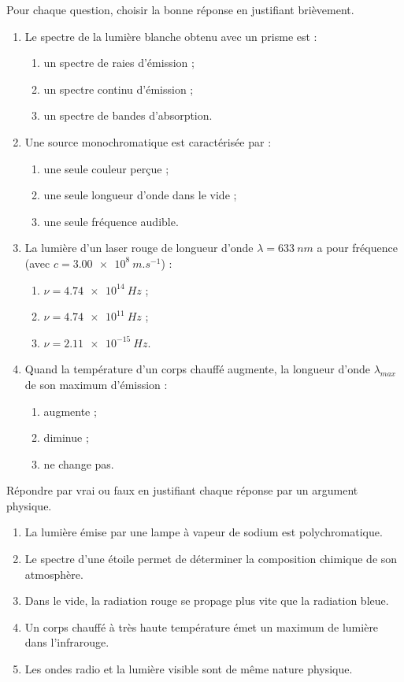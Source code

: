 \documentclass[11pt]{article}
\begin{document}
\begin{exercice}
Pour chaque question, choisir la bonne réponse en justifiant brièvement.
\begin{enumerate}
\item Le spectre de la lumière blanche obtenu avec un prisme est :
\begin{enumerate}
\item un spectre de raies d'émission ;
\item un spectre continu d'émission ;
\item un spectre de bandes d'absorption.
\end{enumerate}
\item Une source monochromatique est caractérisée par :
\begin{enumerate}
\item une seule couleur perçue ;
\item une seule longueur d'onde dans le vide ;
\item une seule fréquence audible.
\end{enumerate}
\item La lumière d'un laser rouge de longueur d'onde $\lambda = \SI{633}{nm}$ a pour fréquence (avec $c = \SI{3,00e8}{m.s^{-1}}$) :
\begin{enumerate}
\item $\nu = \SI{4,74e14}{Hz}$ ;
\item $\nu = \SI{4,74e11}{Hz}$ ;
\item $\nu = \SI{2,11e-15}{Hz}$.
\end{enumerate}
\item Quand la température d'un corps chauffé augmente, la longueur d'onde $\lambda_{max}$ de son maximum d'émission :
\begin{enumerate}
\item augmente ;
\item diminue ;
\item ne change pas.
\end{enumerate}
\end{enumerate}
\end{exercice}

\begin{exercice}
Répondre par vrai ou faux en justifiant chaque réponse par un argument physique.
\begin{enumerate}
\item La lumière émise par une lampe à vapeur de sodium est polychromatique.
\item Le spectre d'une étoile permet de déterminer la composition chimique de son atmosphère.
\item Dans le vide, la radiation rouge se propage plus vite que la radiation bleue.
\item Un corps chauffé à très haute température émet un maximum de lumière dans l'infrarouge.
\item Les ondes radio et la lumière visible sont de même nature physique.
\end{enumerate}
\end{exercice}
\end{document}
